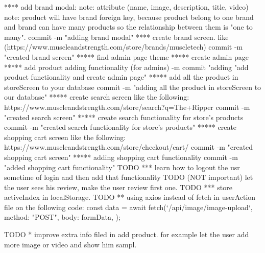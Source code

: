 {**** add brand modal:
      note: attribute (name, image, description, title, video)
      note: product will have brand foreign key, because product belong to one brand and brand can have many products
            so the relationship between them is "one to many".
    commit -m "adding brand modal"
**** create brand screen. like (https://www.muscleandstrength.com/store/brands/muscletech) 
    commit -m "created brand screen"
***** find admin page theme
***** create admin page
***** add product adding functionality (for admins)
    -m commit "adding "add product functionality and create admin page"
***** add all the product in storeScreen to your database
    commit -m "adding all the product in storeScreen to our database"
***** create search screen like the following: https://www.muscleandstrength.com/store/search?q=The+Ripper
      commit -m "created search screen"
***** create search functionality for store's products
      commit -m "created search functionality for store's products"
***** create shopping cart screen like the following:  https://www.muscleandstrength.com/store/checkout/cart/    
      commit -m "created shopping cart screen"
***** adding shopping cart functionality
          commit -m "added shopping cart functionality"
TODO *** learn how to logout the usr sometime of login and then add that functionality
TODO (NOT important) let the user sees his review, make the user review first one.
TODO *** store activeIndex in localStorage.
TODO ** using axios instead of fetch in userAction file on the following code: 
       const data = await fetch(`/api/image/image-upload`, {
      method: "POST",
      body: formData,
    });

TODO * improve extra info filed in add product. for example let the user add more image or video and show him sampl.

}
